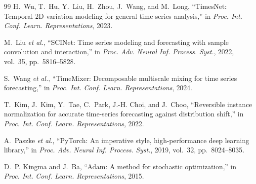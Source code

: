 \documentclass[journal]{IEEEtran}
\begin{document}
\begin{thebibliography}{99}
H.~Wu, T.~Hu, Y.~Liu, H.~Zhou, J.~Wang, and M.~Long, ``TimesNet: Temporal 2D-variation modeling for general time series analysis,'' in \textit{Proc. Int. Conf. Learn. Representations}, 2023.

M.~Liu \textit{et al.}, ``SCINet: Time series modeling and forecasting with sample convolution and interaction,'' in \textit{Proc. Adv. Neural Inf. Process. Syst.}, 2022, vol.~35, pp.~5816--5828.

S.~Wang \textit{et al.}, ``TimeMixer: Decomposable multiscale mixing for time series forecasting,'' in \textit{Proc. Int. Conf. Learn. Representations}, 2024.

T.~Kim, J.~Kim, Y.~Tae, C.~Park, J.-H. Choi, and J.~Choo, ``Reversible instance normalization for accurate time-series forecasting against distribution shift,'' in \textit{Proc. Int. Conf. Learn. Representations}, 2022.

A.~Paszke \textit{et al.}, ``PyTorch: An imperative style, high-performance deep learning library,'' in \textit{Proc. Adv. Neural Inf. Process. Syst.}, 2019, vol.~32, pp.~8024--8035.

D.~P. Kingma and J.~Ba, ``Adam: A method for stochastic optimization,'' in \textit{Proc. Int. Conf. Learn. Representations}, 2015.

\end{thebibliography}
\end{document}
